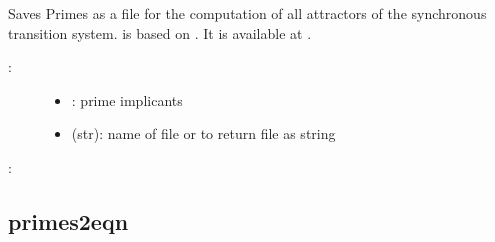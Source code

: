 \documentclass[letterpaper,10pt,english]{sphinxmanual}
\begin{document}
\begin{fulllineitems}
\label{\detokenize{FileExchange:PyBoolNet.FileExchange.primes2bns}}
Saves Primes as a  file for the computation of all attractors of the synchronous transition system.
 is based on {\hyperref[\detokenize{Bibliography:dubrova2011}]{}}.
It is available at .
\begin{description}
\item[{:}] \leavevmode\begin{itemize}
\item {} 
: prime implicants

\item {} 
 (str): name of  file or  to return file as string

\end{itemize}

\end{description}

:

\begin{sphinxVerbatim}[commandchars=\\\{\}]
 
\end{sphinxVerbatim}

\end{fulllineitems}



\subsection{primes2eqn}
\label{\detokenize{FileExchange:primes2eqn}}\label{\detokenize{FileExchange:id8}}
\end{document}
